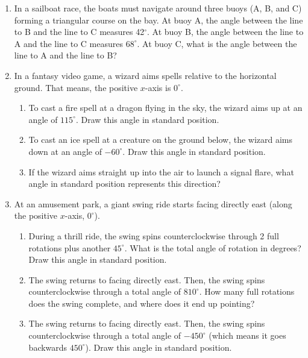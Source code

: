 \begin{enumerate}
\item %
In a sailboat race, the boats must navigate around three buoys (A, B, and C) forming a triangular course on the bay.  At buoy A, the angle between the line to B and the line to C measures 42$^\circ$.  At buoy B, the angle between the line to A and the line to C measures $68^\circ$.  At buoy C, what is the angle between the line to A and the line to B?

\item In a fantasy video game, a wizard aims spells relative to the horizontal ground.  That means, the positive $x$-axis is $0^\circ$.
\begin{enumerate}
    \item To cast a fire spell at a dragon flying in the sky, the wizard aims up at an angle of $115^\circ$. Draw this angle in standard position.
    \item To cast an ice spell at a creature on the ground below, the wizard aims down at an angle of $-60^\circ$. Draw this angle in standard position.
    \item If the wizard aims straight up into the air to launch a signal flare, what angle in standard position represents this direction?
\end{enumerate}

\item At an amusement park, a giant swing ride starts facing directly east (along the positive $x$-axis, $0^\circ$).
\begin{enumerate}
    \item During a thrill ride, the swing spins counterclockwise through 2 full rotations plus another $45^\circ$. What is the total angle of rotation in degrees? Draw this angle in standard position.
    \item The swing returns to facing directly east.  Then, the swing spins counterclockwise through a total angle of $810^\circ$. How many full rotations does the swing complete, and where does it end up pointing?
    \item The swing returns to facing directly east.  Then, the swing spins counterclockwise through a total angle of $-450^\circ$ (which means it goes backwards $450^\circ$). Draw this angle in standard position.
\end{enumerate}

\end{enumerate}

